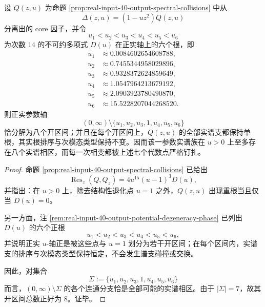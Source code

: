 \begin{theorem}[正实参数轴的有限谱相剖分]\label{thm:conclusion-realinput40-positive-axis-finite-spectral-phase-partition}
设 \(Q(z,u)\) 为命题 \ref{prop:real-input-40-output-spectral-collisions} 中从
\[
\Delta(z,u)=(1-uz^2)Q(z,u)
\]
分离出的 core 因子，并令
\[
u_1<u_2<u_3<u_4<u_5<u_6
\]
为次数 \(14\) 的不可约多项式 \(D(u)\) 在正实轴上的六个根，即
\[
\begin{aligned}
u_1&\approx 0.0084602654608788,\\
u_2&\approx 0.7455344958029896,\\
u_3&\approx 0.9328372624859649,\\
u_4&\approx 1.0547964213679192,\\
u_5&\approx 2.0903923780490870,\\
u_6&\approx 15.5228207044268520.
\end{aligned}
\]
则正实参数轴
\[
(0,\infty)\setminus\{u_1,u_2,u_3,1,u_4,u_5,u_6\}
\]
恰分解为八个开区间；并且在每个开区间上，\(Q(z,u)\) 的全部实谱支都保持单根，其实根排序与次模态类型保持不变。因而该一参数实谱族在 \(u>0\) 上至多存在八个实谱相区，而每一次相变都被上述七个代数点严格钉扎。
\end{theorem}
\begin{proof}
命题 \ref{prop:real-input-40-output-spectral-collisions} 已给出
\[
\operatorname{Res}_z(Q,Q_z)=4u^{15}(u-1)^3D(u),
\]
并指出：在 \(u>0\) 上，除去结构性退化点 \(u=1\) 之外，\(Q(z,u)\) 出现重根当且仅当 \(D(u)=0\)。

另一方面，注 \ref{rem:real-input-40-output-potential-degeneracy-phase} 已列出 \(D(u)\) 的六个正根
\[
u_1<u_2<u_3<u_4<u_5<u_6,
\]
并说明正实 \(u\)-轴正是被这些点与 \(u=1\) 划分为若干开区间；在每个区间内，实谱支的排序与次模态类型保持恒定，不会发生谱支碰撞或交换。

因此，对集合
\[
\Sigma:=\{u_1,u_2,u_3,1,u_4,u_5,u_6\}
\]
而言，\((0,\infty)\setminus\Sigma\) 的各个连通分支恰是全部可能的实谱相区。由于 \(|\Sigma|=7\)，故其开区间总数正好为 \(8\)。证毕。
\end{proof}



